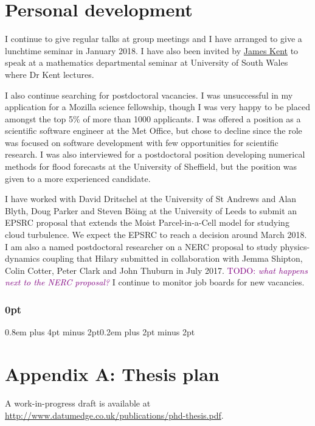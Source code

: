 \documentclass[a4paper,11pt]{article}
\newcommand{\TODO}[1]{\textcolor{purple}{TODO: \emph{#1}}}
\begin{document}

\section{Personal development}

I continue to give regular talks at group meetings and I have arranged to give a lunchtime seminar in January 2018.
I have also been invited by \href{http://staff.southwales.ac.uk/users/8005-jkent}{James Kent} to speak at a mathematics departmental seminar at University of South Wales where Dr Kent lectures.

I also continue searching for postdoctoral vacancies.
I was unsuccessful in my application for a Mozilla science fellowship, though I was very happy to be placed amongst the top 5\% of more than 1000 applicants.
I was offered a position as a scientific software engineer at the Met Office, but chose to decline since the role was focused on software development with few opportunities for scientific research.
I was also interviewed for a postdoctoral position developing numerical methods for flood forecasts at the University of Sheffield, but the position was given to a more experienced candidate.

I have worked with David Dritschel at the University of St Andrews and Alan Blyth, Doug Parker and Steven B\"{o}ing at the University of Leeds to submit an EPSRC proposal that extends the Moist Parcel-in-a-Cell model \citep{boeing2017} for studying cloud turbulence.  We expect the EPSRC to reach a decision around March 2018.
I am also a named postdoctoral researcher on a NERC proposal to study physics-dynamics coupling that Hilary submitted in collaboration with Jemma Shipton, Colin Cotter, Peter Clark and John Thuburn in July 2017.
\TODO{what happens next to the NERC proposal?}
I continue to monitor job boards for new vacancies.

                                                 


\newpage

\titlespacing\subsubsection{0pt}{0.8em plus 4pt minus 2pt}{0.2em plus 2pt minus 2pt}

\section*{Appendix A: Thesis plan}
\footnotesize
A work-in-progress draft is available at \url{http://www.datumedge.co.uk/publications/phd-thesis.pdf}.
\end{document}
